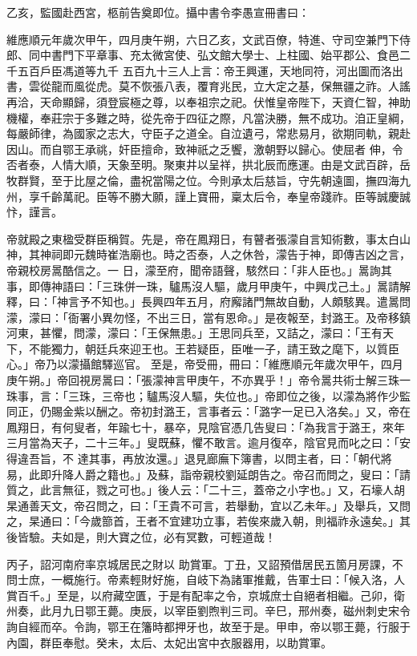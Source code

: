 \begin{pinyinscope}
 乙亥，監國赴西宮，柩前告奠即位。攝中書令李愚宣冊書曰：



 維應順元年歲次甲午，四月庚午朔，六日乙亥，文武百僚，特進、守司空兼門下侍郎、同中書門下平章事、充太微宮使、弘文館大學士、上柱國、始平郡公、食邑二千五百戶臣馮道等九千
 五百九十三人上言：帝王興運，天地同符，河出圖而洛出書，雲從龍而風從虎。莫不恢張八表，覆育兆民，立大定之基，保無疆之祚。人謠再洽，天命顯歸，須登宸極之尊，以奉祖宗之祀。伏惟皇帝陛下，天資仁智，神助機權，奉莊宗于多難之時，從先帝于四征之際，凡當決勝，無不成功。洎正皇綱，每嚴師律，為國家之志大，守臣子之道全。自泣遺弓，常悲易月，欲期同軌，親赴因山。而自鄂王承祧，奸臣擅命，致神祇之乏饗，激朝野以歸心。使屈者
 伸，令否者泰，人情大順，天象至明。聚東井以呈祥，拱北辰而應運。由是文武百辟，岳牧群賢，至于比屋之倫，盡祝當陽之位。今則承太后慈旨，守先朝遠圖，撫四海九州，享千齡萬祀。臣等不勝大願，謹上寶冊，稟太后令，奉皇帝踐祚。臣等誠慶誠忭，謹言。



 帝就殿之東楹受群臣稱賀。先是，帝在鳳翔日，有瞽者張濛自言知術數，事太白山神，其神祠即元魏時崔浩廟也。時之否泰，人之休咎，濛告于神，即傳吉凶之言，帝親校房暠酷信之。一
 日，濛至府，聞帝語聲，駭然曰：「非人臣也。」暠詢其事，即傳神語曰：「三珠併一珠，驢馬沒人驅，歲月甲庚午，中興戊己土。」暠請解釋，曰：「神言予不知也。」長興四年五月，府廨諸門無故自動，人頗駭異。遣暠問濛，濛曰：「衙署小異勿怪，不出三日，當有恩命。」是夜報至，封潞王。及帝移鎮河東，甚懼，問濛，濛曰：「王保無患。」王思同兵至，又詰之，濛曰：「王有天下，不能獨力，朝廷兵來迎王也。王若疑臣，臣唯一子，請王致之麾下，以質臣心。」帝乃以濛攝館驛巡官。
 至是，帝受冊，冊曰：「維應順元年歲次甲午，四月庚午朔。」帝回視房暠曰：「張濛神言甲庚午，不亦異乎！」帝令暠共術士解三珠一珠事，言：「三珠，三帝也；驢馬沒人驅，失位也。」帝即位之後，以濛為將作少監同正，仍賜金紫以酬之。帝初封潞王，言事者云：「潞字一足已入洛矣。」又，帝在鳳翔日，有何叟者，年踰七十，暴卒，見陰官憑几告叟曰：「為我言于潞王，來年三月當為天子，二十三年。」叟既蘇，懼不敢言。逾月復卒，陰官見而叱之曰：「安得違吾旨，不
 達其事，再放汝還。」退見廊廡下簿書，以問主者，曰：「朝代將易，此即升降人爵之籍也。」及蘇，詣帝親校劉延朗告之。帝召而問之，叟曰：「請質之，此言無征，戮之可也。」後人云：「二十三，蓋帝之小字也。」又，石壕人胡杲通善天文，帝召問之，曰：「王貴不可言，若舉動，宜以乙未年。」及舉兵，又問之，杲通曰：「今歲篰首，王者不宜建功立事，若俟來歲入朝，則福祚永遠矣。」其後皆驗。夫如是，則大寶之位，必有冥數，可輕道哉！



 丙子，詔河南府率京城居民之財以
 助賞軍。丁丑，又詔預借居民五箇月房課，不問士庶，一概施行。帝素輕財好施，自岐下為諸軍推戴，告軍士曰：「候入洛，人賞百千。」至是，以府藏空匱，于是有配率之令，京城庶士自絕者相繼。己卯，衛州奏，此月九日鄂王薨。庚辰，以宰臣劉煦判三司。辛巳，邢州奏，磁州刺史宋令詢自經而卒。令詢，鄂王在籓時都押牙也，故至于是。甲申，帝以鄂王薨，行服于內園，群臣奉慰。癸未，太后、太妃出宮中衣服器用，以助賞軍。




\end{pinyinscope}
